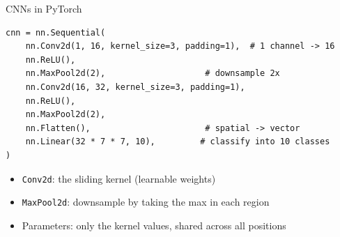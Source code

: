 \documentclass[aspectratio=169]{beamer}
\begin{document}
\begin{frame}[fragile]{CNNs in PyTorch}
\begin{verbatim}
cnn = nn.Sequential(
    nn.Conv2d(1, 16, kernel_size=3, padding=1),  # 1 channel -> 16
    nn.ReLU(),
    nn.MaxPool2d(2),                    # downsample 2x
    nn.Conv2d(16, 32, kernel_size=3, padding=1),
    nn.ReLU(),
    nn.MaxPool2d(2),
    nn.Flatten(),                       # spatial -> vector
    nn.Linear(32 * 7 * 7, 10),         # classify into 10 classes
)
\end{verbatim}
\vspace{0.5em}
\begin{itemize}
\item \texttt{Conv2d}: the sliding kernel (learnable weights)
\item \texttt{MaxPool2d}: downsample by taking the max in each region
\item Parameters: only the kernel values, shared across all positions
\end{itemize}
\end{frame}
\end{document}
